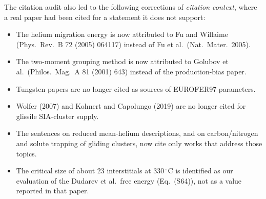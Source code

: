 \documentclass{article}
\newif\ifshowauthornotes
\newcommand{\authornote}[1]{\ifshowauthornotes{\color{red}\ [\textbf{Author action:} #1]}\fi}
\begin{document}
\begin{itemize}
The citation audit also led to the following corrections of \emph{citation context}, where a real paper had been cited for a statement it does not support:
\begin{itemize}
    \item The helium migration energy is now attributed to Fu and Willaime (Phys.\ Rev.\ B 72 (2005) 064117) instead of Fu et al.\ (Nat.\ Mater.\ 2005).
    \item The two-moment grouping method is now attributed to Golubov et al.\ (Philos.\ Mag.\ A 81 (2001) 643) instead of the production-bias paper.
    \item Tungsten papers are no longer cited as sources of EUROFER97 parameters.
    \item Wolfer (2007) and Kohnert and Capolungo (2019) are no longer cited for glissile SIA-cluster supply.
    \item The sentences on reduced mean-helium descriptions, and on carbon/nitrogen and solute trapping of gliding clusters, now cite only works that address those topics.
    \item The critical size of about 23 interstitials at $330\,^\circ$C is identified as our evaluation of the Dudarev et al.\ free energy (Eq.~(S64)), not as a value reported in that paper.
\end{itemize}

\authornote{These citation-context fixes are also not yet in the September 17 PDF (e.g., Eq.~$E^h_m\approx0.06$~eV still cites [80]; the grouping sentence still cites [77]; Table~S3 still cites [28] and [118]). The full audit with per-reference detail is in resubmission/audits/Reference\_Audit\_Generalized\_Cluster\_Dynamics.md.}
\end{itemize}
\end{document}
